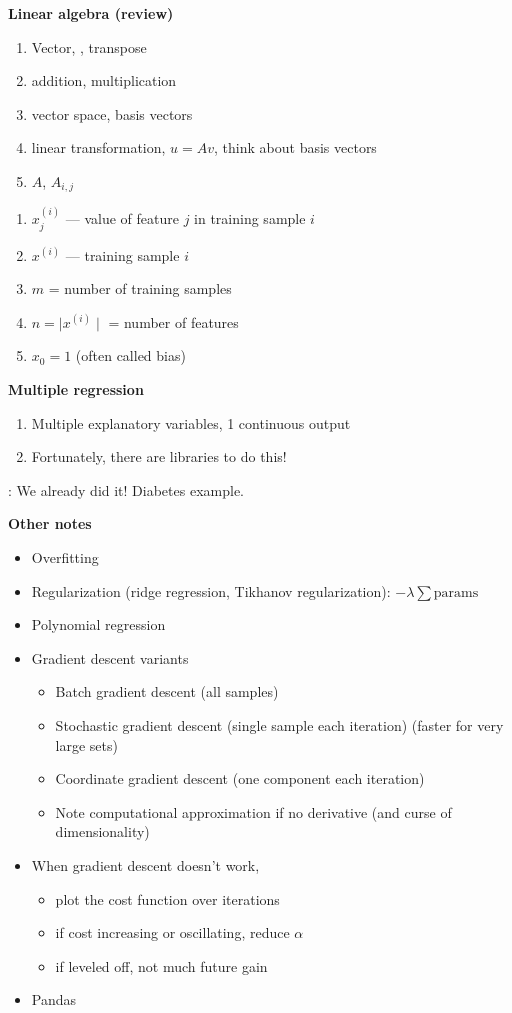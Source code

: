 \textbf{Linear algebra (review)}
\begin{enumerate}
\item Vector, , transpose
\item addition, multiplication
\item vector space, basis vectors
\item linear transformation, $u=Av$, think about basis vectors
\item $A$, $A_{i,j}$
\end{enumerate}

\begin{enumerate}
\item $x_j^{(i)}$ --- value of feature $j$ in training sample $i$
\item $x^{(i)}$ --- training sample $i$
\item $m$ = number of training samples
\item $n = \mid x^{(i)} \mid$ = number of features
\item $x_0 = 1$ (often called bias)
\end{enumerate}

\textbf{Multiple regression}
\begin{enumerate}
\item Multiple explanatory variables, 1 continuous output
\item Fortunately, there are libraries to do this!
\end{enumerate}

 : We already did it!  Diabetes example.

\textbf{Other notes}
\begin{itemize}
\item Overfitting
\item Regularization (ridge regression, Tikhanov regularization): $-\lambda\sum \mbox{params}$
\item Polynomial regression
\item Gradient descent variants
  \begin{itemize}
  \item Batch gradient descent (all samples)
  \item Stochastic gradient descent (single sample each iteration) (faster for very large sets)
  \item Coordinate gradient descent (one component each iteration)
  \item Note computational approximation if no derivative (and curse of dimensionality)
  \end{itemize}
\item When gradient descent doesn't work,
  \begin{itemize}
  \item plot the cost function over iterations
  \item if cost increasing or oscillating, reduce $\alpha$
  \item if leveled off, not much future gain
  \end{itemize}

\item Pandas 
\end{itemize}



